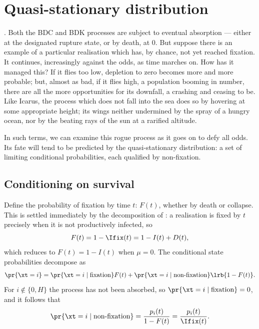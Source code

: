 \section{Quasi-stationary distribution}
\label{sec:qsd}

\cite{van2011quasi}. Both the BDC and BDK processes are subject to eventual
absorption --- either at the designated rupture state, or by death, at $0$.
But suppose there is an example of a particular realisation which has, by
chance, not yet reached fixation. It continues, increasingly against the
odds, as time marches on. How has it managed this? If it flies too low,
depletion to zero becomes more and more probable; but, almost as bad, if it
flies high, a population booming in number, there are all the more
opportunities for its downfall, a crashing and ceasing to be.
Like Icarus, the process which does not fall into the sea does so by
hovering at some appropriate height; its wings neither undermined by the
spray of a hungry ocean, nor by the beating rays of the sun at a rarified
altitude. \par
In such terms, we can examine this rogue process as it goes on to defy all
odds. Its fate will tend to be predicted by the quasi-stationary
distribution: a set of limiting conditional probabilities, each qualified by
non-fixation. \par

\subsection{Conditioning on survival}

Define the probability of fixation by time $t$: $F(t)$, whether by death or
collapse. This is settled immediately by the decomposition of : a
realisation is fixed by $t$ precisely when it is not productively infected,
so
\begin{equation}
F(t)=1-\Ifix(t)=1-I(t)+D(t),
\end{equation}
which reduces to $F(t)=1-I(t)$ when $\mu=0$. The conditional state
probabilities decompose as
$$\pr{\xt = i} = \pr{\xt=i\mid \text{fixation}}F(t) + \pr{\xt=i\mid \text{non-fixation}} \lrb{1-F(t)}.$$
For $i\notin\{0,H\}$ the process has not been absorbed, so
$\pr{\xt=i\mid\text{fixation}}=0$, and it follows that
\begin{equation}
\pr{\xt=i\mid \text{non-fixation}} = \frac{p_i(t)}{1-F(t)}=\frac{p_i(t)}{\Ifix(t)}.
\label{eq:condp}
\end{equation}

